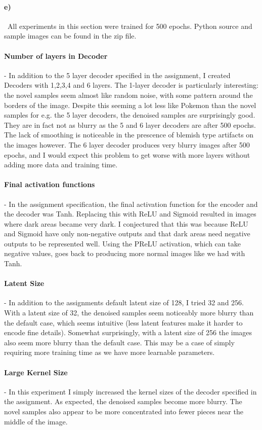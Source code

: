 \documentclass[a4paper,12pt]{article}
\begin{document}
\paragraph{e)}
\
All experiments in this section were trained for 500 epochs. Python source and sample images can be found in the zip file. 
\paragraph{Number of layers in Decoder}- In addition to the 5 layer decoder specified in the assignment, I created Decoders with 1,2,3,4 and 6 layers. The 1-layer decoder is particularly interesting: the novel samples seem almost like random noise, with some pattern around the borders of the image. Despite this seeming a lot less like Pokemon than the novel samples for e.g. the 5 layer decoders, the denoised samples are surprisingly good. They are in fact not as blurry as the 5 and 6 layer decoders are after 500 epochs. The lack of smoothing is noticeable in the prescence of blemish type artifacts on the images however. The 6 layer decoder produces very blurry images after 500 epochs, and I would expect this problem to get worse with more layers without adding more data and training time. 
\paragraph{Final activation functions}- In the assignment specification, the final activation function for the encoder and the decoder was Tanh. Replacing this with ReLU and Sigmoid resulted in images where dark areas became very dark. I conjectured that this was because ReLU and Sigmoid have only non-negative outputs and that dark areas need negative outputs to be represented well. Using the PReLU activation, which can take negative values, goes back to producing more normal images like we had with Tanh. 
\paragraph{Latent Size}- In addition to the assignments default latent size of 128, I tried 32 and 256. With a latent size of 32, the denoised samples seem noticeably more blurry than the default case, which seems intuitive (less latent features make it harder to encode fine details). Somewhat surprisingly, with a latent size of 256 the images also seem more blurry than the default case. This may be a case of simply requiring more training time as we have more learnable parameters.
\paragraph{Large Kernel Size}- In this experiment I simply increased the kernel sizes of the decoder specified in the assignment. As expected, the denoised samples become more blurry. The novel samples also appear to be more concentrated into fewer pieces near the middle of the image. 
\end{document}
